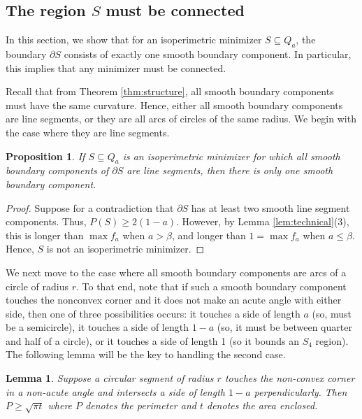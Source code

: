 \documentclass[leqno]{article}
\numberwithin{equation}{section}
\theoremstyle{definition}
\theoremstyle{remark}
\theoremstyle{plain}
\newtheorem{lemma}[equation]{Lemma}
\newtheorem{proposition}[equation]{Proposition}
\begin{document}
\fi

\subsection{\texorpdfstring{The region $S$ must be connected}{The region S must be connected}}\label{sec:Sconnected}

In this section, we show that for an isoperimetric minimizer $S\subseteq Q_a$, the boundary $\partial S$ consists of exactly one smooth boundary component.  In particular, this implies that any minimizer must be connected.

 Recall that from Theorem \ref{thm:structure}, all smooth boundary components must have the same curvature.  Hence, either all smooth boundary components are line segments, or they are all arcs of circles of the same radius.  We begin with the case where they are line segments.

\begin{proposition}  If $S\subseteq Q_a$ is an isoperimetric minimizer for which all smooth boundary components of $\partial S$ are line segments, then there is only one smooth boundary component.
\end{proposition}

\begin{proof}  Suppose for a contradiction that $\partial S$ has at least two smooth line segment components.  Thus, $P(S) \geq 2(1-a)$. However, by Lemma \ref{lem:technical}(3), this is longer than $\max f_a$ when $a> \beta$, and longer than $1 = \max f_a$ when $a\leq \beta$.  Hence, $S$ is not an isoperimetric minimizer.
\end{proof}


We next move to the case where all smooth boundary components are arcs of a circle of radius $r$.  To that end, note that if such a smooth boundary component touches the nonconvex corner and it does not make an acute angle with either side, then one of three possibilities occurs:  it touches a side of length $a$ (so, must be a semicircle), it touches a side of length $1-a$ (so, it must be between quarter and half of a circle), or it touches a side of length 1 (so it bounds an $S_4$ region). The following lemma will be the key to handling the second case.

\begin{lemma}\label{lem:secondcase}
Suppose a circular segment of radius $r$ touches the non-convex corner in a non-acute angle and intersects a side of length $1-a$ perpendicularly.  Then $P\geq \sqrt{\pi t}$ where $P$ denotes the perimeter and $t$ denotes the area enclosed.
\end{lemma}
\end{document}

